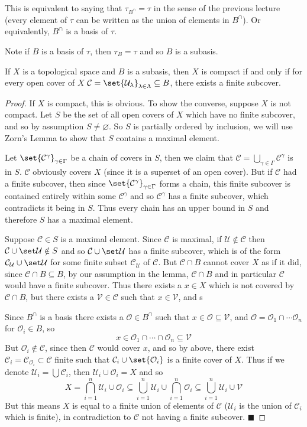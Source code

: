 \documentclass[10pt]{article}
\def\qed{\hskip1cm\penalty-100\hbox{}\hfill$\blacksquare$}
\def\mU{\mathcal{U}}
\def\mV{\mathcal{V}}
\def\mO{\mathcal{O}}
\def\mC{\mathcal{C}}
\begin{document}
This is equivalent to saying that $\tau_{B^\cap}=\tau$ in the sense of the previous lecture (every element of $\tau$ can be written as the union of elements in $B^\cap$).
Or equivalently, $B^\cap$ is a basis of $\tau$.

Note if $B$ is a basis of $\tau$, then $\tau_B=\tau$ and so $B$ is a subasis.

\begin{lemm*}

    If $X$ is a topological space and $B$ is a subasis, then $X$ is compact if and only if for every open cover of $X$ $\mC=\set{\mU_\lambda}_{\lambda\in\Lambda}\subseteq B$, there exists a finite subcover.

\end{lemm*}

\begin{proof}

    If $X$ is compact, this is obvious.
    To show the converse, suppose $X$ is not compact.
    Let $S$ be the set of all open covers of $X$ which have no finite subcover, and so by assumption $S\neq\varnothing$.
    So $S$ is partially ordered by inclusion, we will use Zorn's Lemma to show that $S$ contains a maximal element.

    Let $\set{\mC^\gamma}_{\gamma\in\Gamma}$ be a chain of covers in $S$, then we claim that $\mC=\bigcup_{\gamma\in\Gamma}\mC^\gamma$ is in $S$.
    $\mC$ obviously covers $X$ (since it is a superset of an open cover).
    But if $\mC$ had a finite subcover, then since $\set{\mC^\gamma}_{\gamma\in\Gamma}$ forms a chain, this finite subcover is contained entirely within some $\mC^\gamma$ and so $\mC^\gamma$ has a finite
    subcover, which contradicts it being in $S$.
    Thus every chain has an upper bound in $S$ and therefore $S$ has a maximal element.

    Suppose $\mC\in S$ is a maximal element.
    Since $\mC$ is maximal, if $\mU\notin\mC$ then $\mC\cup\set\mU\notin S$ and so $\mC\cup\set\mU$ has a finite subcover, which is of the form $\mC_\mU\cup\set\mU$ for some finite subset $\mC_\mU$ of $\mC$.
    But $\mC\cap B$ cannot cover $X$ as if it did, since $\mC\cap B\subseteq B$, by our assumption in the lemma, $\mC\cap B$ and in particular $\mC$ would have a finite subcover.
    Thus there exists a $x\in X$ which is not covered by $\mC\cap B$, but there exists a $\mV\in\mC$ such that $x\in\mV$, and s

    Since $B^\cap$ is a basis there exists a $\mO\in B^\cap$ such that $x\in\mO\subseteq\mV$, and $\mO=\mO_1\cap\cdots\mO_n$ for $\mO_i\in B$, so
    \[ x\in\mO_1\cap\cdots\cap\mO_n\subseteq\mV \]
    But $\mO_i\notin\mC$, since then $\mC$ would cover $x$, and so by above, there exist $\mC_i=\mC_{\mO_i}\subset\mC$ finite such that $\mC_i\cup\set{\mO_i}$ is a finite cover of $X$.
    Thus if we denote $\mU_i=\bigcup\mC_i$, then $\mU_i\cup\mO_i=X$ and so
    \[ X = \bigcap_{i=1}^n\mU_i\cup\mO_i \subseteq \bigcup_{i=1}^n\mU_i\cup\bigcap_{i=1}^n\mO_i\subseteq \bigcup_{i=1}^n\mU_i\cup\mV \]
    But this means $X$ is equal to a finite union of elements of $\mC$ ($\mU_i$ is the union of $\mC_i$ which is finite), in contradiction to $\mC$ not having a finite subcover.
    \qed


\end{proof}
\end{document}
